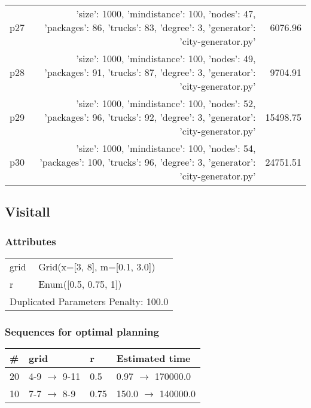 \documentclass{article}
\begin{document}
\begin{center}
\begin{tabular}{@{}l|r|r@{}}
  p27&{'size': 1000, 'mindistance': 100, 'nodes': 47, 'packages': 86, 'trucks': 83, 'degree': 3, 'generator': 'city-generator.py'}&6076.96\\
  p28&{'size': 1000, 'mindistance': 100, 'nodes': 49, 'packages': 91, 'trucks': 87, 'degree': 3, 'generator': 'city-generator.py'}&9704.91\\
  p29&{'size': 1000, 'mindistance': 100, 'nodes': 52, 'packages': 96, 'trucks': 92, 'degree': 3, 'generator': 'city-generator.py'}&15498.75\\
  p30&{'size': 1000, 'mindistance': 100, 'nodes': 54, 'packages': 100, 'trucks': 96, 'degree': 3, 'generator': 'city-generator.py'}&24751.51
                            \end{tabular}
                            \end{center}
                    
                            \newpage \subsection{Visitall}
                    \subsubsection*{Attributes}
                    \begin{tabular}{@{}p{}p{}@{}}
                    \toprule
                    grid & Grid(x=[3, 8], m=[0.1, 3.0])\\
r & Enum([0.5, 0.75, 1]) \\
                    \bottomrule
                    \multicolumn{2}{l}{Duplicated Parameters Penalty: 100.0}
                    \end{tabular}
                
                            \subsubsection*{Sequences for optimal planning}

                            \begin{center}
                            \begin{tabular}{@{}l|l|l|l@{}}
                            \# & grid & r & Estimated time\\\midrule
                            20&4-9 $\rightarrow$ 9-11&0.5&0.97 $\rightarrow$ 170000.0\\
10&7-7 $\rightarrow$ 8-9&0.75&150.0 $\rightarrow$ 140000.0
                            \end{tabular}
                            \end{center}
                    
\end{document}
